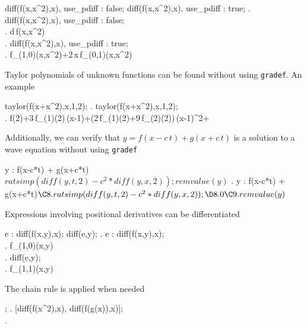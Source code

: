 \beginmaximasession
diff(f(x,x^2),x), use_pdiff : false;
diff(f(x,x^2),x), use_pdiff : true;
\maximatexsession
{}.  diff(f(x,x^2),x), use_pdiff : false; \\
.  {{d}}\,f\left(x,x^2\right) \\
.  diff(f(x,x^2),x), use_pdiff : true; \\
.  f_{\left(1,0\right)}(x,x^2)+2\,x\,f_{\left(0,1\right)}(x,x^2) \\
\endmaximasession

Taylor polynomials of unknown functions can be found without using
{\tt gradef}. An example

\beginmaximasession
taylor(f(x+x^2),x,1,2);
\maximatexsession
{}.  taylor(f(x+x^2),x,1,2); \\
.  f\left(2\right)+3\,f_{\left(1\right)}(2)\,\left(x-1\right)+{{\left(2\,f_{\left(1\right)}(2)+9\,f_{\left(2\right)}(2)\right)\,\left(x-1\right)^2}}+\cdots \\
\endmaximasession

\noindent Additionally, we can verify that $ y = f(x-c \, t) + g(x+c \,t)$ is
a solution to a wave equation without using {\tt gradef}

\beginmaximasession
y : f(x-c*t) + g(x+c*t)$
ratsimp(diff(y,t,2) - c^2 * diff(y,x,2));
remvalue(y)$
\maximatexsession
{}.  y : f(x-c*t) + g(x+c*t)$ \\
\C8.  ratsimp(diff(y,t,2) - c^2 * diff(y,x,2)); \\
\D8.  0 \\
\C9.  remvalue(y)$ \\
\endmaximasession

\noindent Expressions involving  positional derivatives can be differentiated

\beginmaximasession
e : diff(f(x,y),x);
diff(e,y);
\maximatexsession
{}.  e : diff(f(x,y),x); \\
.  f_{\left(1,0\right)}(x,y) \\
.  diff(e,y); \\
.  f_{\left(1,1\right)}(x,y) \\
\endmaximasession

\noindent The chain rule is applied when needed

;
\maximatexsession
{}.  [diff(f(x^2),x), diff(f(g(x)),x)]; \\
.   \\
\endmaximasession

